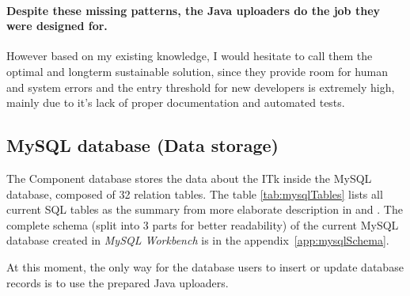 \paragraph{Despite these missing patterns, the Java uploaders do the job they were designed for.} However based on my existing knowledge, I would hesitate to call them the optimal and longterm sustainable solution, since they provide room for human and system errors and the entry threshold for new developers is extremely high, mainly due to it's lack of proper documentation and automated tests.


\subsection{MySQL database (Data storage)}
\par The Component database stores the data about the ITk inside the MySQL database, composed of 32 relation tables. The table \ref{tab:mysqlTables} lists all current SQL tables as the summary from more elaborate description in \cite[pages 29-35]{sverma} and \cite[page 58]{sverma}. The complete schema (split into 3 parts for better readability) of the current MySQL database created in \emph{MySQL Workbench} is in the appendix~\ref{app:mysqlSchema}.

\par At this moment, the only way for the database users to insert or update database records is to use the prepared Java uploaders.


